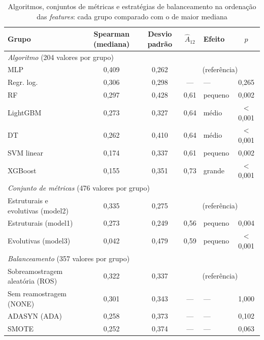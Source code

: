 \begin{table}[htbp]
    
    \centering
    \footnotesize
    \setlength{\tabcolsep}{4pt}%
    \caption{Algoritmos, conjuntos de métricas e estratégias de balanceamento na ordenação das \textit{features}: cada grupo comparado com o de maior mediana}
    \label{tab:res-a12-fatores-feature}
    \begin{tabular}{lccclc}
        \toprule
        Grupo & Spearman (mediana) & Desvio padrão & $\hat{A}_{12}$ & Efeito & $p$ \\
        \midrule
        \multicolumn{6}{l}{\textit{Algoritmo} (204 valores por grupo)} \\
        \quad MLP & 0,409 & 0,262 & \multicolumn{3}{c}{(referência)} \\
        \quad Regr. log. & 0,306 & 0,298 & --- & --- & 0,265 \\
        \quad RF & 0,297 & 0,428 & 0,61 & pequeno & 0,002 \\
        \quad LightGBM & 0,273 & 0,327 & 0,64 & médio & $<$ 0,001 \\
        \quad DT & 0,262 & 0,410 & 0,64 & médio & $<$ 0,001 \\
        \quad SVM linear & 0,174 & 0,337 & 0,61 & pequeno & 0,002 \\
        \quad XGBoost & 0,155 & 0,351 & 0,73 & grande & $<$ 0,001 \\
        \midrule
        \multicolumn{6}{l}{\textit{Conjunto de métricas} (476 valores por grupo)} \\
        \quad Estruturais e evolutivas (model2) & 0,335 & 0,275 & \multicolumn{3}{c}{(referência)} \\
        \quad Estruturais (model1) & 0,273 & 0,249 & 0,56 & pequeno & 0,004 \\
        \quad Evolutivas (model3) & 0,042 & 0,479 & 0,59 & pequeno & $<$ 0,001 \\
        \midrule
        \multicolumn{6}{l}{\textit{Balanceamento} (357 valores por grupo)} \\
        \quad Sobreamostragem aleatória (ROS) & 0,322 & 0,337 & \multicolumn{3}{c}{(referência)} \\
        \quad Sem reamostragem (NONE) & 0,301 & 0,343 & --- & --- & 1,000 \\
        \quad ADASYN (ADA) & 0,258 & 0,373 & --- & --- & 0,102 \\
        \quad SMOTE & 0,252 & 0,374 & --- & --- & 0,063 \\
        \bottomrule
    \end{tabular}
\end{table}%
